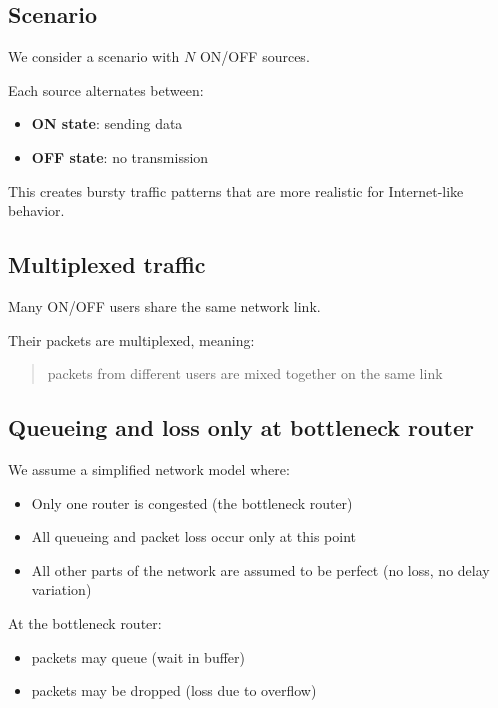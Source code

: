 \subsection*{Scenario}

We consider a scenario with $N$ ON/OFF sources.

Each source alternates between:
\begin{itemize}
    \item \textbf{ON state}: sending data
    \item \textbf{OFF state}: no transmission
\end{itemize}

This creates bursty traffic patterns that are more realistic for Internet-like behavior.

\subsection*{Multiplexed traffic}

Many ON/OFF users share the same network link.

Their packets are multiplexed, meaning:

\begin{quote}
packets from different users are mixed together on the same link
\end{quote}


\subsection*{Queueing and loss only at bottleneck router}

We assume a simplified network model where:

\begin{itemize}
    \item Only one router is congested (the bottleneck router)
    \item All queueing and packet loss occur only at this point
    \item All other parts of the network are assumed to be perfect (no loss, no delay variation)
\end{itemize}

At the bottleneck router:
\begin{itemize}
    \item packets may queue (wait in buffer)
    \item packets may be dropped (loss due to overflow)
\end{itemize}

